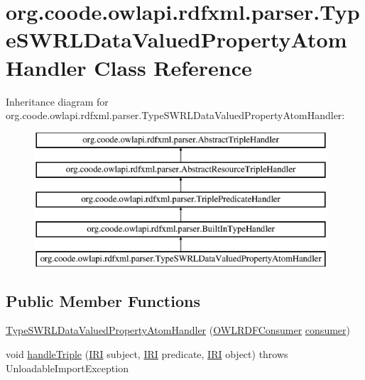 \hypertarget{classorg_1_1coode_1_1owlapi_1_1rdfxml_1_1parser_1_1_type_s_w_r_l_data_valued_property_atom_handler}{\section{org.\-coode.\-owlapi.\-rdfxml.\-parser.\-Type\-S\-W\-R\-L\-Data\-Valued\-Property\-Atom\-Handler Class Reference}
\label{classorg_1_1coode_1_1owlapi_1_1rdfxml_1_1parser_1_1_type_s_w_r_l_data_valued_property_atom_handler}
}
Inheritance diagram for org.\-coode.\-owlapi.\-rdfxml.\-parser.\-Type\-S\-W\-R\-L\-Data\-Valued\-Property\-Atom\-Handler\-:\begin{figure}[H]
\begin{center}
\leavevmode
\includegraphics[height=5.000000cm]{classorg_1_1coode_1_1owlapi_1_1rdfxml_1_1parser_1_1_type_s_w_r_l_data_valued_property_atom_handler}
\end{center}
\end{figure}
\subsection*{Public Member Functions}
\begin{DoxyCompactItemize}
\item 
\hyperlink{classorg_1_1coode_1_1owlapi_1_1rdfxml_1_1parser_1_1_type_s_w_r_l_data_valued_property_atom_handler_ab2739ec56b2be586dc2ec8240ba8cedb}{Type\-S\-W\-R\-L\-Data\-Valued\-Property\-Atom\-Handler} (\hyperlink{classorg_1_1coode_1_1owlapi_1_1rdfxml_1_1parser_1_1_o_w_l_r_d_f_consumer}{O\-W\-L\-R\-D\-F\-Consumer} \hyperlink{classorg_1_1coode_1_1owlapi_1_1rdfxml_1_1parser_1_1_abstract_triple_handler_a4ccf4d898ff01eb1cadfa04b23d54e9c}{consumer})
\item 
void \hyperlink{classorg_1_1coode_1_1owlapi_1_1rdfxml_1_1parser_1_1_type_s_w_r_l_data_valued_property_atom_handler_a06e56cffd3c4927a523234186f52a595}{handle\-Triple} (\hyperlink{classorg_1_1semanticweb_1_1owlapi_1_1model_1_1_i_r_i}{I\-R\-I} subject, \hyperlink{classorg_1_1semanticweb_1_1owlapi_1_1model_1_1_i_r_i}{I\-R\-I} predicate, \hyperlink{classorg_1_1semanticweb_1_1owlapi_1_1model_1_1_i_r_i}{I\-R\-I} object)  throws Unloadable\-Import\-Exception 
\end{DoxyCompactItemize}
